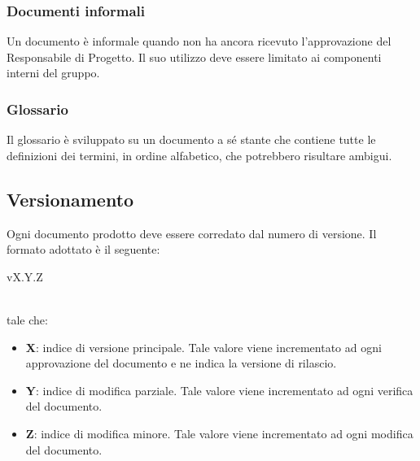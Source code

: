 \subsubsection{Documenti informali}
Un documento è informale quando non ha ancora ricevuto l'approvazione del Responsabile di Progetto. Il suo utilizzo deve essere limitato ai componenti interni del gruppo.

\subsubsection{Glossario}
Il glossario è sviluppato su un documento a sé stante che contiene tutte le definizioni dei termini, in ordine alfabetico, che potrebbero risultare ambigui.

\subsection{Versionamento}
Ogni documento prodotto deve essere corredato dal numero di versione. Il formato adottato è il seguente:
\\
\begin{center}
	vX.Y.Z
\end{center}
\\
tale che:
\begin{itemize}
	\item \textbf{X}: indice di versione principale. Tale valore viene incrementato ad ogni approvazione del documento e ne indica la versione di rilascio.
	\item \textbf{Y}: indice di modifica parziale. Tale valore viene incrementato ad ogni verifica del documento.
	\item \textbf{Z}: indice di modifica minore. Tale valore viene incrementato ad ogni modifica del documento.
\end{itemize}

